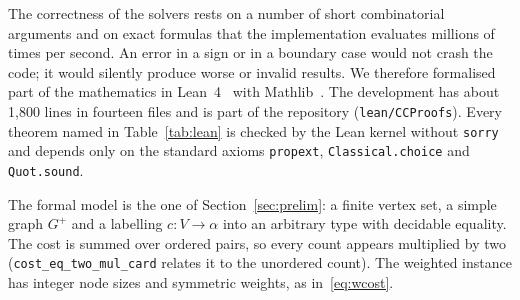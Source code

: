 The correctness of the solvers rests on a number of short combinatorial
arguments and on exact formulas that the implementation evaluates millions of
times per second.  An error in a sign or in a boundary case would not crash
the code; it would silently produce worse or invalid results.  We therefore
formalised part of the mathematics in Lean~4~\citep{deMouraU21lean4} with
Mathlib~\citep{mathlib2020}.  The development has about 1{,}800 lines in
fourteen files and is part of the repository (\texttt{lean/CCProofs}).  Every
theorem named in Table~\ref{tab:lean} is checked by the Lean kernel without
\texttt{sorry} and depends only on the standard axioms \texttt{propext},
\texttt{Classical.choice} and \texttt{Quot.sound}.

The formal model is the one of Section~\ref{sec:prelim}: a finite vertex set,
a simple graph $G^+$ and a labelling $c:V\to\alpha$ into an arbitrary type
with decidable equality.  The cost is summed over ordered pairs, so every
count appears multiplied by two (\texttt{cost\_eq\_two\_mul\_card} relates it
to the unordered count).  The weighted instance has integer node sizes and
symmetric weights, as in~\eqref{eq:wcost}.

